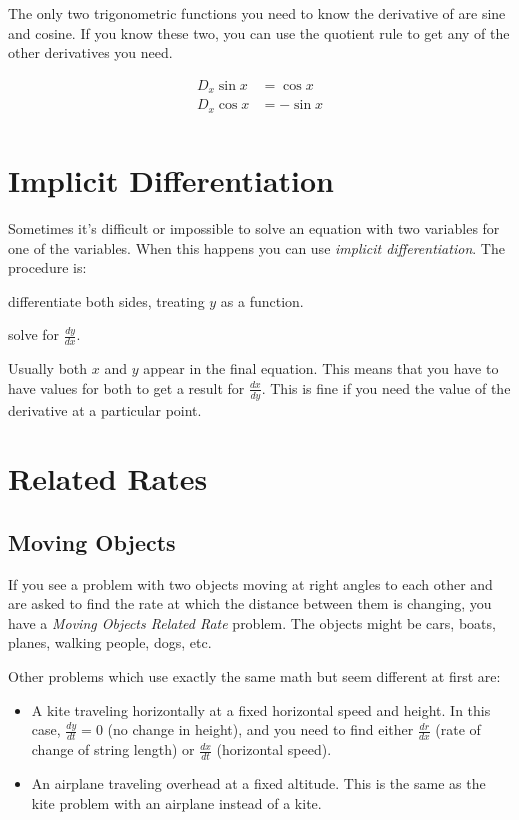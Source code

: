 \documentclass[fleqn]{article}
\begin{document}
The only two trigonometric functions you need to know the derivative of are sine and cosine.  If you know these two, you
can use the quotient rule to get any of the other derivatives you need.  

\begin{align*}
  D_x \sin x &= \cos x \\
  D_x \cos x &= - \sin x \\
\end{align*}

\section{Implicit Differentiation}
Sometimes it's difficult or impossible to solve an equation with two variables for one of the variables.  When this
happens you can use {\em implicit differentiation}.  The procedure is:

\begin{itemize*}
  \item differentiate both sides, treating $y$ as a function.
  \item solve for $\frac{dy}{dx}$.
\end{itemize*}

Usually both $x$ and $y$ appear in the final equation.  This means that you have to have values for both to get a result
for $\frac{dx}{dy}$.  This is fine if you need the value of the derivative at a particular point.

\section{Related Rates}
\label{related-rates}

\subsection{Moving Objects}

If you see a problem with two objects moving at right angles to each other and are asked to find the rate at which the
distance between them is changing, you have a {\em Moving Objects Related Rate} problem.  The objects might be cars,
boats, planes, walking people, dogs, etc.

Other problems which use exactly the same math but seem different at first are:
\begin{itemize}
\item A kite traveling horizontally at a fixed horizontal speed and height.  In this case, $\frac{dy}{dt} = 0$ (no
  change in height), and you need to find either $\frac{dr}{dx}$ (rate of change of string length) or $\frac{dx}{dt}$
  (horizontal speed).
\item An airplane traveling overhead at a fixed altitude.  This is the same as the kite problem with an airplane instead
  of a kite.
\end{itemize}
\end{document}

